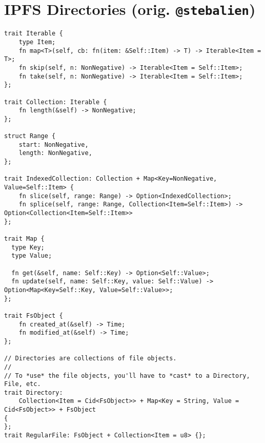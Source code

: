 \documentclass[11pt]{article}
\begin{document}
\newpage
\section{IPFS Directories (orig. \texttt{@stebalien})}
\label{sec:dirs}

\begin{lstlisting}
trait Iterable {
    type Item;
    fn map<T>(self, cb: fn(item: &Self::Item) -> T) -> Iterable<Item = T>;
    fn skip(self, n: NonNegative) -> Iterable<Item = Self::Item>;
    fn take(self, n: NonNegative) -> Iterable<Item = Self::Item>;
};

trait Collection: Iterable {
    fn length(&self) -> NonNegative;
};

struct Range {
    start: NonNegative,
    length: NonNegative,
};

trait IndexedCollection: Collection + Map<Key=NonNegative, Value=Self::Item> {
    fn slice(self, range: Range) -> Option<IndexedCollection>;
    fn splice(self, range: Range, Collection<Item=Self::Item>) -> Option<Collection<Item=Self::Item>>
};

trait Map {
  type Key;
  type Value;

  fn get(&self, name: Self::Key) -> Option<Self::Value>;
  fn update(self, name: Self::Key, value: Self::Value) -> Option<Map<Key=Self::Key, Value=Self::Value>>;
};

trait FsObject {
    fn created_at(&self) -> Time;
    fn modified_at(&self) -> Time;
};

// Directories are collections of file objects.
//
// To *use* the file objects, you'll have to *cast* to a Directory, File, etc.
trait Directory:
    Collection<Item = Cid<FsObject>> + Map<Key = String, Value = Cid<FsObject>> + FsObject
{
};
trait RegularFile: FsObject + Collection<Item = u8> {};
\end{lstlisting}
\end{document}
